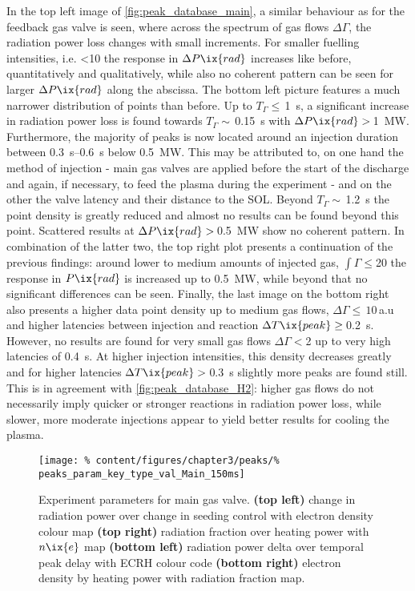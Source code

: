             In the top left image of \cref{fig:peak_database_main}, a similar behaviour as for the feedback gas valve is seen, where across the spectrum of gas flows $\Delta\Gamma$, the radiation power loss changes with small increments. For smaller fuelling intensities, i.e. <\SI{10}{\arbitraryunit} the response in $\Delta P\ix{rad}$ increases like before, quantitatively and qualitatively, while also no coherent pattern can be seen for larger $\Delta P\ix{rad}$ along the abscissa. The bottom left picture features a much narrower distribution of points than before. Up to $T_{\Gamma}\le\,$\SI{1}{\second}, a significant increase in radiation power loss is found towards $T_{\Gamma}\sim\,$\SI{0.15}{\second} with $\Delta P\ix{rad}>\,$\SI{1}{\mega\watt}. Furthermore, the majority of peaks is now located around an injection duration between \SIrange{0.3}{0.6}{\second} below \SI{0.5}{\mega\watt}. This may be attributed to, on one hand the method of injection - main gas valves are applied before the start of the discharge and again, if necessary, to feed the plasma during the experiment - and on the other the valve latency and their distance to the SOL. Beyond $T_{\Gamma}\sim\,$\SI{1.2}{\second} the point density is greatly reduced and almost no results can be found beyond this point. Scattered results at $\Delta P\ix{rad}>\,$\SI{0.5}{\mega\watt} show no coherent pattern. In combination of the latter two, the top right plot presents a continuation of the previous findings: around lower to medium amounts of injected gas, $\int\Gamma\le$\SI{20}{\arbitraryunit} the response in $P\ix{rad}$ is increased up to \SI{0.5}{\mega\watt}, while beyond that no significant differences can be seen. Finally, the last image on the bottom right also presents a higher data point density up to medium gas flows, $\Delta\Gamma\le\,10\,$a.u and higher latencies between injection and reaction $\Delta T\ix{peak}\ge\,$\SI{0.2}{\second}. However, no results are found for very small gas flows $\Delta\Gamma<$\SI{2}{\arbitraryunit} up to very high latencies of \SI{0.4}{\second}. At higher injection intensities, this density decreases greatly and for higher latencies $\Delta T\ix{peak}>\,$\SI{0.3}{\second} slightly more peaks are found still. This is in agreement with \cref{fig:peak_database_H2}: higher gas flows do not necessarily imply quicker or stronger reactions in radiation power loss, while slower, more moderate injections appear to yield better results for cooling the plasma.\\%
%
            \begin{figure}[t]%
                \centering%
                \texttt{[image: \%
                    content/figures/chapter3/peaks/\%
                    peaks\_param\_key\_type\_val\_Main\_150ms]}%
                \caption{Experiment parameters for main gas valve. \textbf{(top left)} change in radiation power over change in seeding control with electron density colour map \textbf{(top right)} radiation fraction over heating power with $n\ix{e}$ map \textbf{(bottom left)} radiation power delta over temporal peak delay with ECRH colour code \textbf{(bottom right)} electron density by heating power with radiation fraction map.}\label{fig:peak_parameters_Main}%
            \end{figure}%

